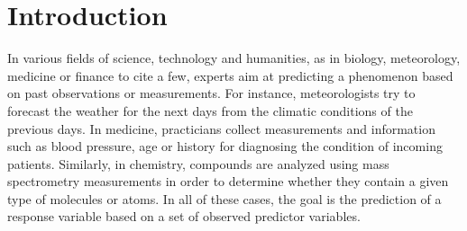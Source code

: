 \chapter{Introduction}\label{ch:introduction}

In various fields of science, technology and humanities, as in biology,
meteorology, medicine or finance to cite a few, experts aim at predicting a
phenomenon based on past observations or measurements. For instance,
meteorologists try to forecast the weather for the next days from the climatic
conditions of the previous days. In medicine, practicians collect measurements
and information such as blood pressure, age or history for diagnosing the
condition of incoming patients. Similarly, in chemistry, compounds are analyzed
using mass spectrometry measurements in order to determine whether they contain
a given type of molecules or atoms. In all of these cases, the goal is the
prediction of a response variable based on a set of observed predictor
variables.

